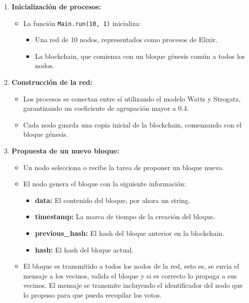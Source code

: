 {\large{
    \begin{enumerate}
        \item \textbf{Inicialización de procesos:}
        \begin{itemize}
            \item La función \texttt{Main.run(10, 1)} inicializa:
            \begin{itemize}
                \item Una red de 10 nodos, representados como procesos de Elixir.
                \item La blockchain, que comienza con un bloque génesis común a todos los nodos.
            \end{itemize}
        \end{itemize}
        
        \item \textbf{Construcción de la red:}
        \begin{itemize}
            \item Los procesos se conectan entre sí utilizando el modelo Watts y Strogatz, garantizando un coeficiente de agrupación mayor a 0.4.
            \item Cada nodo guarda una copia inicial de la blockchain, comenzando con el bloque génesis.
        \end{itemize}
        
        \item \textbf{Propuesta de un nuevo bloque:}
        \begin{itemize}
            \item Un nodo selecciona o recibe la tarea de proponer un bloque nuevo.
            \item El nodo genera el bloque con la siguiente información:
            \begin{itemize}
                \item \textbf{data:} El contenido del bloque, por ahora un string.
                \item \textbf{timestamp:} La marca de tiempo de la creación del bloque.
                \item \textbf{previous\_hash:} El hash del bloque anterior en la blockchain.
                \item \textbf{hash:} El hash del bloque actual.
            \end{itemize}
            \item El bloque es transmitido a todos los nodos de la red, esto es, se envia el mensaje a los vecinos, valida el bloque y si es correcto lo propaga a sus vecinos. El mensaje se transmite incluyendo el identificador del nodo que lo propuso para que pueda recopilar los votos.
        \end{itemize}
        

\end{enumerate}}}
